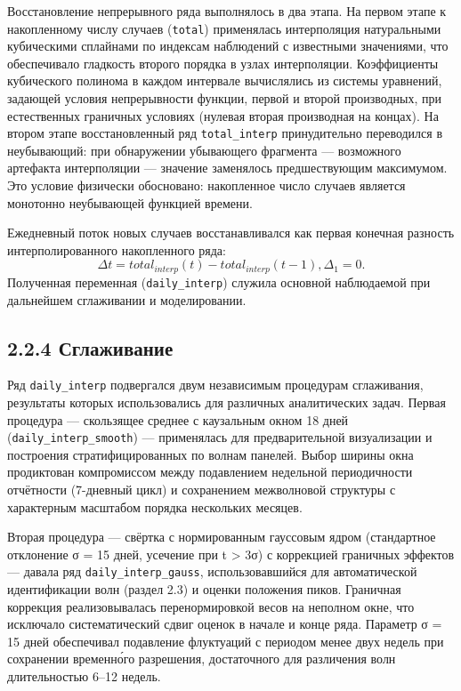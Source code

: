 \documentclass[12pt]{article}
\begin{document}
Восстановление непрерывного ряда выполнялось в два этапа. На первом
этапе к накопленному числу случаев (\texttt{total}) применялась
интерполяция натуральными кубическими сплайнами по индексам наблюдений с
известными значениями, что обеспечивало гладкость второго порядка в
узлах интерполяции. Коэффициенты кубического полинома в каждом интервале
вычислялись из системы уравнений, задающей условия непрерывности
функции, первой и второй производных, при естественных граничных
условиях (нулевая вторая производная на концах). На втором этапе
восстановленный ряд \texttt{total\_interp} принудительно переводился в
неубывающий: при обнаружении убывающего фрагмента --- возможного
артефакта интерполяции --- значение заменялось предшествующим
максимумом. Это условие физически обосновано: накопленное число случаев
является монотонно неубывающей функцией времени.

Ежедневный поток новых случаев восстанавливался как первая конечная
разность интерполированного накопленного ряда: \[
\Delta t​= total_{interp}(t)−total_{interp}(t−1),\Delta_1​=0.
\] Полученная переменная (\texttt{daily\_interp}) служила основной
наблюдаемой при дальнейшем сглаживании и моделировании.

\subsection{2.2.4
Сглаживание}\label{ux441ux433ux43bux430ux436ux438ux432ux430ux43dux438ux435}

Ряд \texttt{daily\_interp} подвергался двум независимым процедурам
сглаживания, результаты которых использовались для различных
аналитических задач. Первая процедура --- скользящее среднее с
каузальным окном 18 дней (\texttt{daily\_interp\_smooth}) ---
применялась для предварительной визуализации и построения
стратифицированных по волнам панелей. Выбор ширины окна продиктован
компромиссом между подавлением недельной периодичности отчётности
(7-дневный цикл) и сохранением межволновой структуры с характерным
масштабом порядка нескольких месяцев.

Вторая процедура --- свёртка с нормированным гауссовым ядром
(стандартное отклонение σ = 15 дней, усечение при \textbar t\textbar{}
\textgreater{} 3σ) с коррекцией граничных эффектов --- давала ряд
\texttt{daily\_interp\_gauss}, использовавшийся для автоматической
идентификации волн (раздел 2.3) и оценки положения пиков. Граничная
коррекция реализовывалась перенормировкой весов на неполном окне, что
исключало систематический сдвиг оценок в начале и конце ряда. Параметр σ
= 15 дней обеспечивал подавление флуктуаций с периодом менее двух недель
при сохранении временно́го разрешения, достаточного для различения волн
длительностью 6--12 недель.
\end{document}
